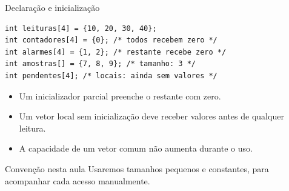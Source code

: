 \begin{frame}[fragile]{Declaração e inicialização}
\begin{lstlisting}
int leituras[4] = {10, 20, 30, 40};
int contadores[4] = {0}; /* todos recebem zero */
int alarmes[4] = {1, 2}; /* restante recebe zero */
int amostras[] = {7, 8, 9}; /* tamanho: 3 */
int pendentes[4]; /* locais: ainda sem valores */
\end{lstlisting}
\begin{itemize}
\item Um inicializador parcial preenche o restante com zero.
\item Um vetor local sem inicialização deve receber valores antes de qualquer leitura.
\item A capacidade de um vetor comum não aumenta durante o uso.
\end{itemize}
\begin{block}{Convenção nesta aula}
Usaremos tamanhos pequenos e constantes, para acompanhar cada acesso manualmente.
\end{block}
\end{frame}

